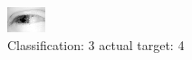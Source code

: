\begin{figure}[h!]
\begin{center}
\includegraphics[width=0.60\columnwidth]{figures/ID2541_class_3_target_4.png}
\end{center}
\caption{ Classification: 3 actual target: 4}
\label{fig:ID2541_class_3_target_4}
\end{figure}
